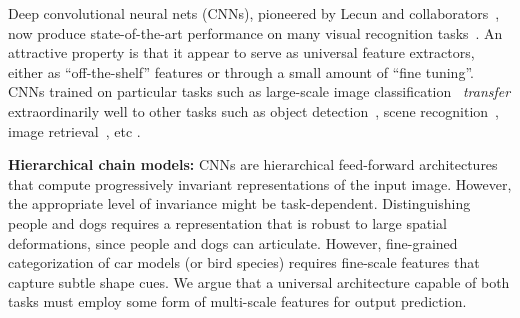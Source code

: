 \documentclass[10pt,twocolumn,letterpaper]{article}
\begin{document}
Deep convolutional neural nets (CNNs), pioneered by Lecun and collaborators~\cite{lecun1998gradient}, now produce state-of-the-art performance on many visual recognition tasks~\cite{AlexNet, veryDeep, GoogLeNet}. An attractive property is that it appear to serve as universal feature extractors, either as ``off-the-shelf'' features or through a small amount of ``fine tuning''. CNNs trained on particular tasks such as large-scale image classification~\cite{ImageNet} {\em transfer} extraordinarily well to other tasks such as object detection~\cite{rcnn}, scene recognition~\cite{zhoulearning}, image retrieval~\cite{Gong14}, etc \cite{cnn_baseline}.

{\bf Hierarchical chain models:}  CNNs are 
hierarchical feed-forward architectures that compute progressively invariant representations of the input image. However, the appropriate level of invariance might be task-dependent. Distinguishing people and dogs requires a representation that is robust to large spatial deformations, since people and dogs can articulate. However, fine-grained categorization of car models (or bird species) requires fine-scale features that capture subtle shape cues. We argue that a universal architecture capable of both tasks must employ some form of multi-scale features for output prediction.
\end{document}
